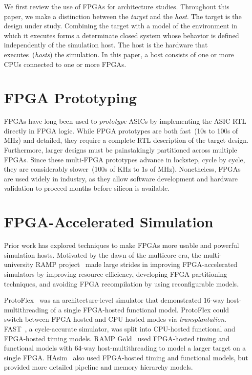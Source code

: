 
We first review the use of FPGAs for architecture studies.  Throughout
this paper, we make a distinction between the \emph{target} and
the \emph{host}.  The target is the design under study.  Combining the
target with a model of the environment in which it executes forms a
determinate closed system whose behavior is defined independently of
the simulation host.  The host is the hardware that
executes~(\emph{hosts}) the simulation.  In this paper, a host
consists of one or more CPUs connected to one or more FPGAs.

\section{FPGA Prototyping}
FPGAs have long been used to \emph{prototype} ASICs by implementing
the ASIC RTL directly in FPGA logic.  While FPGA prototypes are both
fast~(10s to 100s of MHz) and detailed, they require a complete RTL
description of the target design. Furthermore, larger designs must be
painstakingly partitioned across multiple FPGAs. Since these
multi-FPGA prototypes advance in lockstep, cycle by cycle, they are
considerably slower~(100s of KHz to 1s of MHz). Nonetheless, FPGAs are used widely
in industry, as they allow software development and hardware
validation to proceed months before silicon is available.

\section{FPGA-Accelerated Simulation}

Prior work has explored techniques to make FPGAs more usable and
powerful simulation hosts.  Motivated by the dawn of the multicore
era, the multi-university RAMP project~\cite{RAMP} made large strides
in improving FPGA-accelerated simulators by improving resource
efficiency, developing FPGA partitioning techniques, and avoiding FPGA
recompilation by using reconfigurable models.

ProtoFlex~\cite{ProtoFlex} was an architecture-level simulator that
demonstrated 16-way host-multithreading of a single FPGA-hosted functional model.
ProtoFlex could switch between FPGA-hosted and CPU-hosted modes via
\emph{transplantation}. FAST~\cite{FAST}, a cycle-accurate simulator, was
split into CPU-hosted functional and FPGA-hosted timing models.  RAMP
Gold~\cite{RAMPGold} used FPGA-hosted timing and functional models
with 64-way host-multithreading to model a larger target on a single
FPGA.  HAsim~\cite{HASim} also used FPGA-hosted timing and functional
models, but provided more detailed pipeline and memory hierarchy
models.

